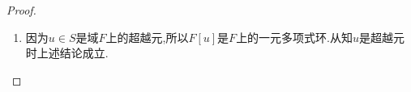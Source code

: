 \documentclass[../../main.tex]{subfiles}%
\begin{document}
\begin{proof}
\begin{enumerate}[(1)]
最后证明$p\left( x \right)$的唯一性。若还存在次数大于等于1的首一不可约多项式$p'\left( x \right) \in F\left[ x \right]$，使得
\begin{align*}
F\left[ u \right] \cong F\left[ x \right] /\langle p'\left( x \right) \rangle,\quad \langle p'\left( x \right) \rangle \cap F=\left\{ 0 \right\}.
\end{align*}
则
\begin{align*}
F\left[ x \right] /\langle p\left( x \right) \rangle \cong F\left[ u \right] \cong F\left[ x \right] /\langle p'\left( x \right) \rangle.
\end{align*}
从而由知$\langle p\left( x \right) \rangle =\langle p'\left( x \right) \rangle$，再由知$p\left( x \right) \sim p'\left( x \right)$。
而$p\left( x \right),p'\left( x \right)$都是首一不可约多项式，故$p'\left( x \right) =p\left( x \right)$或$1$。
若$p'\left( x \right) =1$，则与$\text{deg}p'(x)\geqslant 1$矛盾！因此$p'\left( x \right) =p\left( x \right).$

反之,若$p(x)$是不可约多项式,则由知$\langle p(x) \rangle$为素理想,再由知$p(x)$为$F[x]$中的素元素,于是由知$\langle p(x) \rangle$为极大理想.故由知$F[x]/\langle p(x) \rangle$是域,显然$F[x]/\langle p(x) \rangle\supseteq F$,故$F[x]/\langle p(x) \rangle$是$F$的扩域.

\item 因为$u \in S$是域$F$上的超越元,所以$F[u]$是$F$上的一元多项式环.从知$u$是超越元时上述结论成立.
\end{enumerate}

\end{proof}
\end{document}
